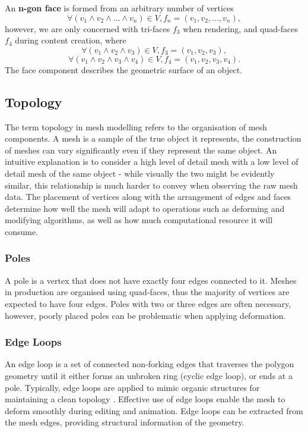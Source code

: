 \documentclass[ %
author={Dillon Keith Diep},
supervisor={Dr. Carl Henrik Ek},
degree={MEng},
title={ART-CG:},
subtitle={Assisted Real-time Content Generation of 3D Hair by Learning Manifolds},
type={Research},
year={2017} ]{dissertation}
\begin{document}
An \textbf{n-gon face} is formed from an arbitrary number of vertices 
$$\forall (v_1 \land v_2 \land ... \land v_n) \in V, f_n = (v_1, v_2,..., v_n),$$ 
however, we are only concerned with tri-faces $f_3$ when rendering, and quad-faces $f_4$ during content creation, where
$$\forall (v_1 \land v_2 \land v_3) \in V, f_3 = (v_1, v_2, v_3),$$
$$\forall (v_1 \land v_2 \land v_3 \land v_4) \in V, f_4 = (v_1, v_2, v_3, v_4).$$
The face component describes the geometric surface of an object.

\subsection{Topology}
The term topology in mesh modelling refers to the organisation of mesh components\cite[p.91]{blenderstudio}. A mesh is a sample of the true object it represents, the construction of meshes can vary significantly even if they represent the same object. An intuitive explanation is to consider a high level of detail mesh with a low level of detail mesh of the same object - while visually the two might be evidently similar, this relationship is much harder to convey when observing the raw mesh data. The placement of vertices along with the arrangement of edges and faces determine how well the mesh will adapt to operations such as deforming and modifying algorithms, as well as how much computational resource it will consume.

\subsubsection{Poles}
A pole is a vertex that does not have exactly four edges connected to it\cite[p.92]{blenderstudio}. Meshes in production are organised using quad-faces, thus the majority of vertices are expected to have four edges. Poles with two or three edges are often necessary, however, poorly placed poles can be problematic when applying deformation.

\subsubsection{Edge Loops}
An edge loop is a set of connected non-forking edges that traverses the polygon geometry until it either forms an unbroken ring (cyclic edge loop), or ends at a pole\cite[p.93]{blenderstudio}. Typically, edge loops are applied to mimic organic structures for maintaining a clean topology \cite[pp.10-12]{edgeloops}. Effective use of edge loops enable the mesh to deform smoothly during editing and animation. Edge loops can be extracted from the mesh edges, providing structural information of the geometry.
\end{document}
